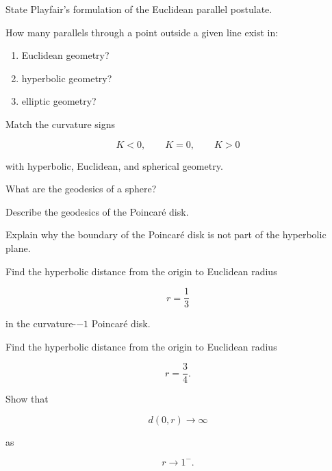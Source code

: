 \begin{exercise}[1]
State Playfair's formulation of the Euclidean parallel postulate.
\end{exercise}

\begin{exercise}[1]
How many parallels through a point outside a given line exist in:

\begin{enumerate}
    \item Euclidean geometry?
    \item hyperbolic geometry?
    \item elliptic geometry?
\end{enumerate}
\end{exercise}

\begin{exercise}[1]
Match the curvature signs

\[
K<0,\qquad K=0,\qquad K>0
\]

with hyperbolic, Euclidean, and spherical geometry.
\end{exercise}

\begin{exercise}[1]
What are the geodesics of a sphere?
\end{exercise}

\begin{exercise}[1]
Describe the geodesics of the Poincar\'e disk.
\end{exercise}

\begin{exercise}[2]
Explain why the boundary of the Poincar\'e disk is not part of the
hyperbolic plane.
\end{exercise}

\begin{exercise}[2]
Find the hyperbolic distance from the origin to Euclidean radius

\[
r=\frac13
\]

in the curvature-\(-1\) Poincar\'e disk.
\end{exercise}

\begin{exercise}[2]
Find the hyperbolic distance from the origin to Euclidean radius

\[
r=\frac34.
\]
\end{exercise}

\begin{exercise}[2]
Show that

\[
d(0,r)\to\infty
\]

as

\[
r\to1^-.
\]
\end{exercise}

